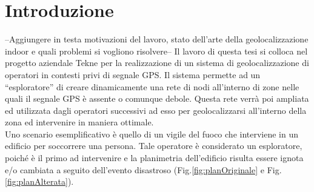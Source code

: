 \chapter*{Introduzione}
\thispagestyle{empty}
--Aggiungere in testa motivazioni del lavoro, stato dell’arte della geolocalizzazione indoor e quali problemi si vogliono risolvere--
\newline\newline
Il lavoro di questa tesi si colloca nel progetto aziendale Tekne per la realizzazione di un sistema di geolocalizzazione di operatori in contesti privi di segnale GPS.
Il sistema permette ad un “esploratore” di creare dinamicamente una rete di nodi all’interno di zone nelle quali il segnale GPS è assente o comunque debole. Questa rete verrà poi ampliata ed utilizzata dagli operatori successivi ad esso per geolocalizzarsi all’interno della zona ed intervenire in maniera ottimale. \\
Uno scenario esemplificativo è quello di un vigile del fuoco che interviene in un edificio per soccorrere una persona. Tale operatore è considerato un esploratore, poiché è il primo ad intervenire e la planimetria dell’edificio risulta essere ignota e/o cambiata a seguito dell’evento disastroso (Fig.\ref{fig:planOriginale} e Fig.\ref{fig:planAlterata}). 

